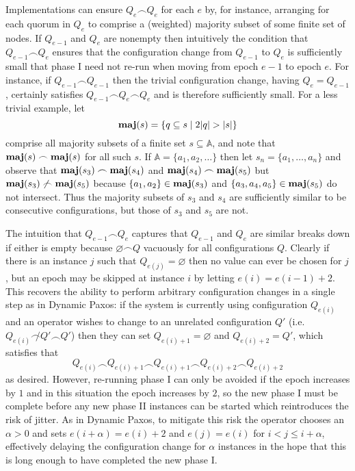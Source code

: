 \documentclass[journal]{IEEEtran}
\begin{document}
Implementations can ensure $Q_e \frown Q_e$ for each $e$ by, for instance,
arranging for each quorum in $Q_e$ to comprise a (weighted) majority subset of
some finite set of nodes.  If $Q_{e-1}$ and $Q_e$ are nonempty then intuitively
the condition that $Q_{e-1} \frown Q_e$ ensures that the configuration change
from $Q_{e-1}$ to $Q_e$ is sufficiently small that phase I need not re-run when
moving from epoch $e-1$ to epoch $e$.  For instance, if $Q_{e-1} \frown
Q_{e-1}$ then the trivial configuration change, having $Q_e = Q_{e-1}$,
certainly satisfies $Q_{e-1} \frown Q_e \frown Q_e$ and is therefore
sufficiently small.
%
For a less trivial example, let \[\mathbf{maj}(s) = \{ q \subseteq s \mid 2 |q| > |s|
\}\] comprise all majority subsets of a finite set $s \subseteq \mathbb A$, and
note that $\mathbf{maj}(s) \frown \mathbf{maj}(s)$ for all such $s$.  If $\mathbb A = \{ a_1,
a_2, \ldots \}$ then let $s_n = \{a_1, \ldots, a_n\}$ and observe that
${\mathbf{maj}(s_3) \frown \mathbf{maj}(s_4)}$ and ${\mathbf{maj}(s_4) \frown \mathbf{maj}(s_5)}$ but
${\mathbf{maj}(s_3) \not\frown \mathbf{maj}(s_5)}$ because $\{a_1, a_2\} \in \mathbf{maj}(s_3)$ and
$\{a_3, a_4, a_5\} \in \mathbf{maj}(s_5)$ do not intersect. Thus the majority subsets
of $s_3$ and $s_4$ are sufficiently similar to be consecutive configurations,
but those of $s_3$ and $s_5$ are not.

The intuition that $Q_{e-1} \frown Q_e$ captures that $Q_{e-1}$ and $Q_e$ are
similar breaks down if either is empty because $\varnothing \frown Q$ vacuously
for all configurations $Q$. Clearly if there is an instance $j$ such that
$Q_{e(j)} = \varnothing$ then no value can ever be chosen for $j$, but an epoch
may be skipped at instance $i$ by letting $e(i) = e(i-1) + 2$.  This recovers
the ability to perform arbitrary configuration changes in a single step as in
Dynamic Paxos: if the system is currently using configuration $Q_{e(i)}$ and an
operator wishes to change to an unrelated configuration $Q'$ (i.e.  $Q_{e(i)}
\not\frown Q' \frown Q'$) then they can set $Q_{e(i)+1} = \varnothing$ and
$Q_{e(i)+2} = Q'$, which satisfies that \[Q_{e(i)} \frown Q_{e(i) + 1} \frown
Q_{e(i)+1} \frown Q_{e(i) + 2} \frown Q_{e(i) + 2}\] as desired. However,
re-running phase I can only be avoided if the epoch increases by $1$ and in
this situation the epoch increases by $2$, so the new phase I must be complete
before any new phase II instances can be started which reintroduces the risk of
jitter.  As in Dynamic Paxos, to mitigate this risk the operator chooses an
$\alpha > 0$ and sets $e(i+\alpha) = e(i)+2$ and $e(j) = e(i)$ for $i < j \le i
+ \alpha$, effectively delaying the configuration change for $\alpha$ instances
in the hope that this is long enough to have completed the new phase I.
\end{document}
